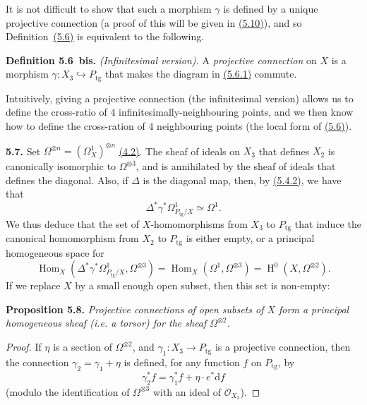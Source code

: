\documentclass{report}
\newenvironment{itenv}[1]
  {\phantomsection\par\medskip\noindent\textbf{#1.}\itshape}
  {\par\medskip}
\newenvironment{rmenv}[1]
  {\phantomsection\par\medskip\noindent\textbf{#1.}\rmfamily}
  {\par\medskip}
\renewcommand{\cal}[1]{{\mathcal{#1}}}
\newcommand{\dd}{\mathrm{d}}
\newcommand{\tg}{\mathrm{tg}}
\DeclareMathOperator{\Hom}{Hom}
\DeclareMathOperator{\HH}{H}
\newcommand{\oldpage}[1]{\marginpar{\footnotesize$\Big\vert$ \textit{p.~#1}}}
\begin{document}
It is not difficult to show that such a morphism $\gamma$ is defined by a unique projective connection (a proof of this will be given in \hyperref[I.5.10]{(5.10)}), and so Definition~\hyperref[I.5.6]{(5.6)} is equivalent to the following.

\begin{rmenv}{Definition 5.6~bis}
\label{I.5.6bis}
  \emph{(Infinitesimal version).}
  A \emph{projective connection} on $X$ is a morphism $\gamma\colon X_3\hookrightarrow P_\tg$ that makes the diagram in \hyperref[I.5.6.1]{(5.6.1)} commute.
\end{rmenv}

Intuitively, giving a projective connection (the infinitesimal version) allows us to define the cross-ratio of 4 infinitesimally-neighbouring points, and we then know how to define the cross-ration of 4 neighbouring points (the local form of \hyperref[II.5.6]{(5.6)}).

\begin{rmenv}{5.7}
\label{I.5.7}
  Set $\Omega^{\otimes n}=(\Omega_X^1)^{\otimes n}$ \hyperref[I.4.2]{(4.2)}.
  The sheaf of ideals on $X_3$ that defines $X_2$ is
\oldpage{32}
  canonically isomorphic to $\Omega^{\otimes3}$, and is annihilated by the sheaf of ideals that defines the diagonal.
  Also, if $\Delta$ is the diagonal map, then, by \hyperref[I.5.4.2]{(5.4.2)}, we have that
  \[
    \Delta^*\gamma^*\Omega_{P_\tg/X}^1 \simeq \Omega^1.
  \]
  We thus deduce that the set of $X$-homomorphisms from $X_3$ to $P_\tg$ that induce the canonical homomorphism from $X_2$ to $P_\tg$ is either empty, or a principal homogeneous space for
  \[
    \Hom_X(\Delta^*\gamma^*\Omega_{P_\tg/X}^1, \Omega^{\otimes3})
    = \Hom_X(\Omega^1,\Omega^{\otimes3})
    = \HH^0(X,\Omega^{\otimes2}).
  \]
  If we replace $X$ by a small enough open subset, then this set is non-empty:
\end{rmenv}

\begin{itenv}{Proposition 5.8}
\label{I.5.8}
  Projective connections of open subsets of $X$ form a principal homogeneous sheaf (i.e. a torsor) for the sheaf $\Omega^{\otimes2}$.
\end{itenv}

\begin{proof}
  If $\eta$ is a section of $\Omega^{\otimes2}$, and $\gamma_1\colon X_3\to P_\tg$ is a projective connection, then the connection $\gamma_2=\gamma_1+\eta$ is defined, for any function $f$ on $P_\tg$, by
  \[
  \label{I.5.8.1}
    \gamma_2^*f = \gamma_1^*f + \eta\cdot e^*\dd f
  \tag{5.8.1}
  \]
  (modulo the identification of $\Omega^{\otimes3}$ with an ideal of $\cal{O}_{X_3}$).
\end{proof}
\end{document}

